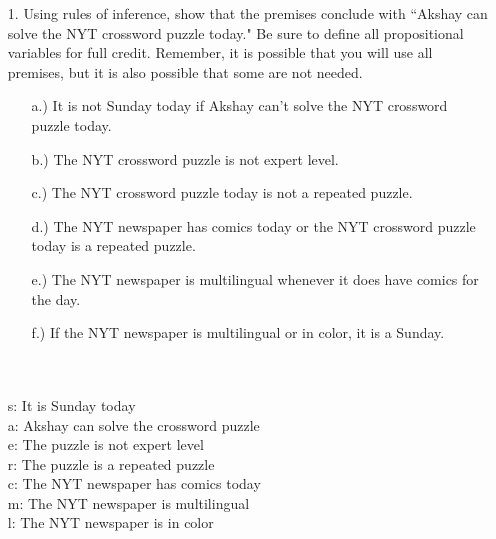 \begin{enumerate}
    \item[1.]{Using rules of inference, show that the premises conclude with ``Akshay can solve the NYT crossword puzzle today." Be sure to define all propositional variables for full credit. Remember, it is possible that you will use all premises, but it is also possible that some are not needed.}
    
    \begin{enumerate}
        \item[a.)] It is not Sunday today if Akshay can't solve the NYT crossword puzzle today.
        \item[b.)] The NYT crossword puzzle is not expert level.
        \item[c.)] The NYT crossword puzzle today is not a repeated puzzle.
        \item[d.)] The NYT newspaper has comics today or the NYT crossword puzzle today is a repeated puzzle.
        \item[e.)] The NYT newspaper is multilingual whenever it does have comics for the day.
        \item[f.)] If the NYT newspaper is multilingual or in color, it is a Sunday.
    \end{enumerate}
    \begin{solution}
            \\
            \\ s: It is Sunday today
            \\ a: Akshay can solve the crossword puzzle
            \\ e: The puzzle is not expert level
            \\ r: The puzzle is a repeated puzzle
            \\ c: The NYT newspaper has comics today
            \\ m: The NYT newspaper is multilingual
            \\ l: The NYT newspaper is in color
            

\end{solution}
\end{enumerate}
